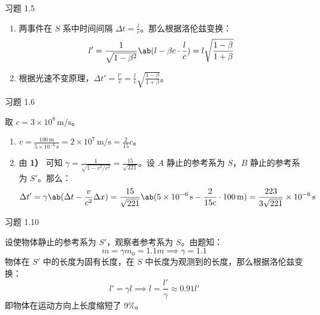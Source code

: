 \begin{problem}
    习题 1.5
    \begin{solution}
        \begin{enumerate}
            \item[\textbf{1)}] 两事件在 $S$ 系中时间间隔 $\Delta t = \frac{l}{c}$。那么根据洛伦兹变换：
            $$
            l' = \frac{1}{\sqrt{1 - \beta^2}} \ab(l - \beta c \cdot \frac{l}{c}) = l \sqrt{\frac{1 - \beta}{1 + \beta}} \\
            $$
            \item[\textbf{2)}] 根据光速不变原理，$\Delta t' = \frac{l'}{c} = \frac{l}{c} \sqrt{\frac{1 - \beta}{1 + \beta}}$。
        \end{enumerate}
    \end{solution}
\end{problem}

\begin{problem}
    习题 1.6
    \begin{solution}
        取 $c = 3 \times 10^{8} \,\mathrm{m / s}$。

        \begin{enumerate}
            \item[\textbf{1)}] $v = \frac{100 \,\mathrm{m}}{5 \times 10^{-6} \,\mathrm{s}} = 2 \times 10^7 \,\mathrm{m / s} = \frac{2}{15} c$。
            \item[\textbf{2)}] 由 \textbf{1）} 可知 $\gamma = \frac{1}{\sqrt{1 - v^2 / c^2}} = \frac{15}{\sqrt{221}}$。设 $A$ 静止的参考系为 $S$，$B$ 静止的参考系为 $S'$。那么：
            $$
            \Delta t' = \gamma \ab(\Delta t - \frac{v}{c^2} \Delta x) = \frac{15}{\sqrt{221}} \ab(5 \times 10^{-6} \,\mathrm{s} - \frac{2}{15 c} \cdot 100\,\mathrm{m}) = \frac{223}{3 \sqrt{221}} \times 10^{-6} \,\mathrm{s}
            $$
        \end{enumerate}
    \end{solution}
\end{problem}

\begin{problem}
    习题 1.10
    \begin{solution}
        设使物体静止的参考系为 $S'$，观察者参考系为 $S$。由题知：
        $$
        m = \gamma m_0 = 1.1m \implies \gamma = 1.1
        $$
        物体在 $S'$ 中的长度为固有长度，在 $S$ 中长度为观测到的长度，那么根据洛伦兹变换：
        $$
        l' = \gamma l \implies l = \frac{l'}{\gamma} \approx 0.91 l'
        $$
        即物体在运动方向上长度缩短了 $9 \%$。
    \end{solution}
\end{problem}